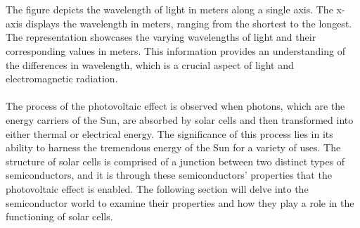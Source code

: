 \documentclass{report}
\begin{document}
\\
\\
The figure depicts the wavelength of light in meters along a single axis. The x-axis displays the wavelength in meters, ranging from the shortest to the longest. The representation showcases the varying wavelengths of light and their corresponding values in meters. This information provides an understanding of the differences in wavelength, which is a crucial aspect of light and electromagnetic radiation.\\
\\
The process of the photovoltaic effect is observed when photons, which are the energy carriers of the Sun, are absorbed by solar cells and then transformed into either thermal or electrical energy. The significance of this process lies in its ability to harness the tremendous energy of the Sun for a variety of uses. The structure of solar cells is comprised of a junction between two distinct types of semiconductors, and it is through these semiconductors' properties that the photovoltaic effect is enabled. The following section will delve into the semiconductor world to examine their properties and how they play a role in the functioning of solar cells\cite{CAPV}.
\end{document}
